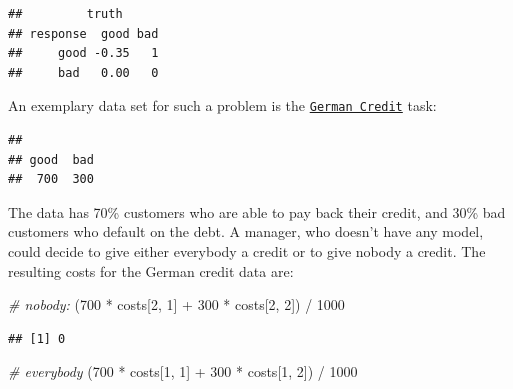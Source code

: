 \documentclass[
]{scrbook}
\newenvironment{Shaded}{\begin{snugshade}}{\end{snugshade}}
\newcommand{\CommentTok}[1]{\textcolor[rgb]{0.56,0.35,0.01}{\textit{#1}}}
\newcommand{\DecValTok}[1]{\textcolor[rgb]{0.00,0.00,0.81}{#1}}
\newcommand{\FunctionTok}[1]{\textcolor[rgb]{0.00,0.00,0.00}{#1}}
\newcommand{\NormalTok}[1]{#1}
\newcommand{\OtherTok}[1]{\textcolor[rgb]{0.56,0.35,0.01}{#1}}
\newcommand{\SpecialCharTok}[1]{\textcolor[rgb]{0.00,0.00,0.00}{#1}}
\newcommand{\StringTok}[1]{\textcolor[rgb]{0.31,0.60,0.02}{#1}}
\renewenvironment{Shaded} {\begin{snugshade}\small} {\end{snugshade}}
\begin{document}
\begin{verbatim}
##         truth
## response  good bad
##     good -0.35   1
##     bad   0.00   0
\end{verbatim}

An exemplary data set for such a problem is the \href{https://mlr3.mlr-org.com/reference/mlr_tasks_german_credit.html}{\texttt{German\ Credit}} task:

\begin{Shaded}
\end{Shaded}

\begin{verbatim}
## 
## good  bad 
##  700  300
\end{verbatim}

The data has 70\% customers who are able to pay back their credit, and 30\% bad customers who default on the debt.
A manager, who doesn't have any model, could decide to give either everybody a credit or to give nobody a credit.
The resulting costs for the German credit data are:

\begin{Shaded}
\begin{Highlighting}[]
\CommentTok{\# nobody:}
\NormalTok{(}\DecValTok{700} \SpecialCharTok{*}\NormalTok{ costs[}\DecValTok{2}\NormalTok{, }\DecValTok{1}\NormalTok{] }\SpecialCharTok{+} \DecValTok{300} \SpecialCharTok{*}\NormalTok{ costs[}\DecValTok{2}\NormalTok{, }\DecValTok{2}\NormalTok{]) }\SpecialCharTok{/} \DecValTok{1000}
\end{Highlighting}
\end{Shaded}

\begin{verbatim}
## [1] 0
\end{verbatim}

\begin{Shaded}
\begin{Highlighting}[]
\CommentTok{\# everybody}
\NormalTok{(}\DecValTok{700} \SpecialCharTok{*}\NormalTok{ costs[}\DecValTok{1}\NormalTok{, }\DecValTok{1}\NormalTok{] }\SpecialCharTok{+} \DecValTok{300} \SpecialCharTok{*}\NormalTok{ costs[}\DecValTok{1}\NormalTok{, }\DecValTok{2}\NormalTok{]) }\SpecialCharTok{/} \DecValTok{1000}
\end{Highlighting}
\end{Shaded}
\end{document}
